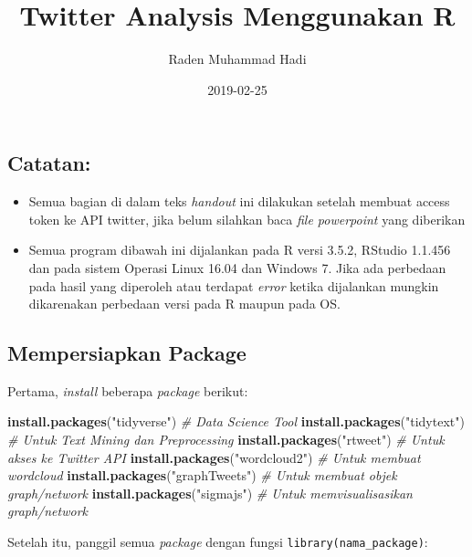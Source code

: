 \documentclass[]{tufte-handout}
\title{Twitter Analysis Menggunakan R}
\author{Raden Muhammad Hadi}
\date{2019-02-25}
\newenvironment{Shaded}{}{}
\newcommand{\KeywordTok}[1]{\textcolor[rgb]{0.00,0.44,0.13}{\textbf{#1}}}
\newcommand{\StringTok}[1]{\textcolor[rgb]{0.25,0.44,0.63}{#1}}
\newcommand{\CommentTok}[1]{\textcolor[rgb]{0.38,0.63,0.69}{\textit{#1}}}
\newcommand{\NormalTok}[1]{#1}
\providecommand{\tightlist}{%
  \setlength{\itemsep}{0pt}\setlength{\parskip}{0pt}}
\begin{document}
\maketitle




\subsection{Catatan:}\label{catatan}

\begin{itemize}
\tightlist
\item
  Semua bagian di dalam teks \emph{handout} ini dilakukan setelah
  membuat access token ke API twitter, jika belum silahkan baca
  \emph{file powerpoint} yang diberikan
\item
  Semua program dibawah ini dijalankan pada R versi 3.5.2, RStudio
  1.1.456 dan pada sistem Operasi Linux 16.04 dan Windows 7. Jika ada
  perbedaan pada hasil yang diperoleh atau terdapat \emph{error} ketika
  dijalankan mungkin dikarenakan perbedaan versi pada R maupun pada OS.
\end{itemize}

\subsection{Mempersiapkan Package}\label{mempersiapkan-package}

Pertama, \emph{install} beberapa \emph{package} berikut:

\begin{Shaded}
\begin{Highlighting}[]
\KeywordTok{install.packages}\NormalTok{(}\StringTok{"tidyverse"}\NormalTok{) }\CommentTok{# Data Science Tool}
\KeywordTok{install.packages}\NormalTok{(}\StringTok{"tidytext"}\NormalTok{) }\CommentTok{# Untuk Text Mining dan Preprocessing}
\KeywordTok{install.packages}\NormalTok{(}\StringTok{"rtweet"}\NormalTok{) }\CommentTok{# Untuk akses ke Twitter API}
\KeywordTok{install.packages}\NormalTok{(}\StringTok{"wordcloud2"}\NormalTok{) }\CommentTok{# Untuk membuat wordcloud}
\KeywordTok{install.packages}\NormalTok{(}\StringTok{"graphTweets"}\NormalTok{) }\CommentTok{# Untuk membuat objek graph/network }
\KeywordTok{install.packages}\NormalTok{(}\StringTok{"sigmajs"}\NormalTok{) }\CommentTok{# Untuk memvisualisasikan graph/network}
\end{Highlighting}
\end{Shaded}

Setelah itu, panggil semua \emph{package} dengan fungsi
\texttt{library(nama\_package)}:
\end{document}
